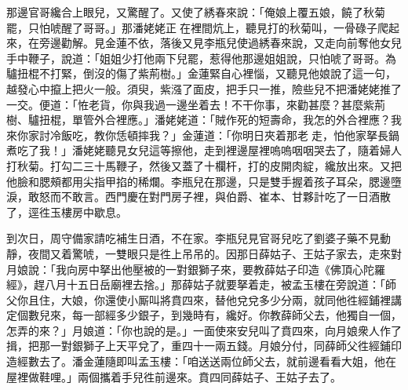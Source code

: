 那邊官哥纔合上眼兒，又驚醒了。{}又使了綉春來說：「俺娘上覆五娘，饒了秋菊罷，只怕唬醒了哥哥。」那潘姥姥正𢱉在裡間炕上，聽見打的秋菊叫，一骨碌子爬起來，在旁邊勸解。見金蓮不依，落後又見李瓶兒使過綉春來說，又走向前奪他女兒手中鞭子，說道：「姐姐少打他兩下兒罷，惹得他那邊姐姐說，只怕唬了哥哥。為驢扭棍不打緊，倒沒的傷了紫荊樹。」金蓮緊自心裡惱，又聽見他娘說了這一句，越發心中攛上把火一般。須臾，紫漒了面皮，把手只一推，險些兒不把潘姥姥推了一交。便道：「恠老貨，你與我過一邊坐着去！不干你事，來勸甚麼？甚麼紫荊樹、驢扭棍，單管外合裡應。」潘姥姥道：「賊作死的短壽命，{}我怎的外合裡應？我來你家討冷飯吃，教你恁頓摔我？」金蓮道：「你明日夾着那老𣭈走，怕他家拏長鍋煮吃了我！」{}潘姥姥聽見女兒這等擦他，走到裡邊屋裡嗚嗚咽咽哭去了，隨着婦人打秋菊。打勾二三十馬鞭子，然後又蓋了十欄杆，打的皮開肉綻，纔放出來。又把他臉和腮頰都用尖指甲掐的稀爛。{}李瓶兒在那邊，只是雙手握着孩子耳朵，腮邊墮淚，敢怒而不敢言。西門慶在對門房子裡，與伯爵、崔本、甘夥計吃了一日酒散了，逕徃玉樓房中歇息。

到次日，周守備家請吃補生日酒，不在家。李瓶兒見官哥兒吃了劉婆子藥不見動靜，夜間又着驚唬，一雙眼只是徃上吊吊的。因那日薛姑子、王姑子家去，走來對月娘說：「我向房中拏出他壓被的一對銀獅子來，要教薛姑子印造《佛頂心陀羅經》，趕八月十五日岳廟裡去捨。」那薛姑子就要拏着走，被孟玉樓在旁說道：「師父你且住，大娘，你還使小厮叫將賁四來，替他兌兌多少分兩，就同他徃經鋪裡講定個數兒來，每一部經多少銀子，到幾時有，纔好。你教薛師父去，他獨自一個，怎弄的來？」{}月娘道：「你也說的是。」一面使來安兒叫了賁四來，向月娘衆人作了揖，把那一對銀獅子上天平兌了，重四十一兩五錢。月娘分付，同薛師父徃經鋪印造經數去了。潘金蓮隨即叫孟玉樓：「咱送送兩位師父去，就前邊看看大姐，他在屋裡做鞋哩。」兩個攜着手兒徃前邊來。賁四同薛姑子、王姑子去了。

